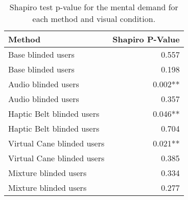 
\begin{table}[!htb]
\centering
\caption{Shapiro test p-value for the mental demand for each method and visual condition.}
\label{tab:shapiro_mental_demand}
\begin{tabular}{lr}
\toprule
                    Method & Shapiro P-Value \\
\midrule
        Base blinded users &           0.557 \\
        Base blinded users &           0.198 \\
       Audio blinded users &         0.002** \\
       Audio blinded users &           0.357 \\
 Haptic Belt blinded users &         0.046** \\
 Haptic Belt blinded users &           0.704 \\
Virtual Cane blinded users &         0.021** \\
Virtual Cane blinded users &           0.385 \\
     Mixture blinded users &           0.334 \\
     Mixture blinded users &           0.277 \\
\bottomrule
\end{tabular}
\end{table}


